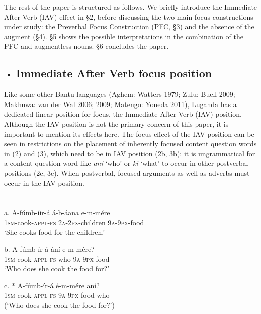 \documentclass[output=paper]{langsci/langscibook}
\begin{document}
  The rest of the paper is structured as follows. We briefly introduce the Immediate After Verb (IAV) effect in §2, before discussing the two main focus constructions under study: the Preverbal Focus Construction (PFC, §3) and the absence of the augment (§4). §5 shows the possible interpretations in the combination of the PFC and augmentless nouns. §6 concludes the paper.

\begin{itemize}
\item \section{ \label{bkm:Ref297362392}Immediate After Verb focus position}
\end{itemize}

Like some other Bantu languages (Aghem: Watters 1979; Zulu: Buell 2009; Makhuwa: van der Wal 2006; 2009; Matengo: Yoneda 2011), Luganda has a dedicated linear position for focus, the Immediate After Verb (IAV) position. Although the IAV position is not the primary concern of this paper, it is important to mention its effects here. The focus effect of the IAV position can be seen in restrictions on the placement of inherently focused content question words in (2) and (3), which need to be in IAV position (2b, 3b): it is ungrammatical for a content question word like \textit{ani} ‘who’ or \textit{ki} ‘what’ to occur in other postverbal positions (2c, 3c). When postverbal, focused arguments as well as adverbs must occur in the IAV position.

\chapter{}
\gll a.  A-fúmb-íir-á    á-b-áana    e-m-mére\\
       \textsc{1sm}{}-cook-\textsc{appl}{}-\textsc{fs}  \textsc{2a}{}-\textsc{2px}{}-children  \textsc{9a}{}-\textsc{9px}{}-food\\
\glt   ‘She cooks food for the children.’
\z

\gll b.  A-fúmb-ír-á    ání  e-m-mére?\\
       \textsc{1sm}{}-cook-\textsc{appl}{}-\textsc{fs}  who  \textsc{9a}{}-\textsc{9px}{}-food\\
\glt   ‘Who does she cook the food for?’
\z

\gll c.  * A-fúmb-ír-á  é-m-mére   aní?\\
       \textsc{1sm}{}-cook-\textsc{appl}{}-\textsc{fs}  \textsc{9a-9px}{}-food  who\\
\glt   (‘Who does she cook the food for?’)
\z
\end{document}
